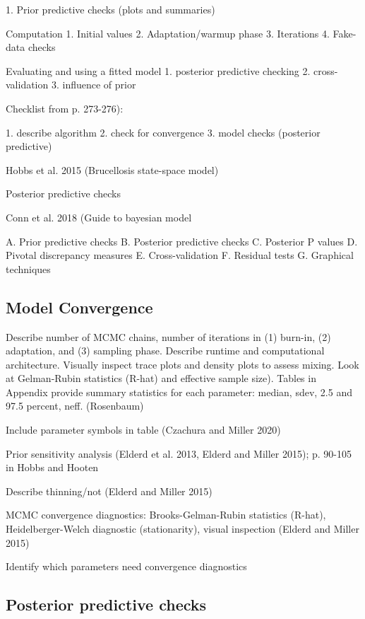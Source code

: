 \documentclass[12pt, oneside, titlepage]{article}   	%
\begin{document}
1. Prior predictive checks (plots and summaries)

Computation
1. Initial values
2. Adaptation/warmup phase
3. Iterations
4. Fake-data checks

Evaluating and using a fitted model
1. posterior predictive checking
2. cross-validation
3. influence of prior

Checklist from \cite{hobbs2015b} p. 273-276):

1. describe algorithm
2. check for convergence
3. model checks (posterior predictive)

Hobbs et al. 2015 (Brucellosis state-space model)

Posterior predictive checks

Conn et al. 2018 (Guide to bayesian model 

A. Prior predictive checks
B. Posterior predictive checks
C. Posterior P values
D. Pivotal discrepancy measures
E. Cross-validation
F. Residual tests
G. Graphical techniques

\subsection{Model Convergence}

Describe number of MCMC chains, number of iterations in (1) burn-in, (2) adaptation, and (3) sampling phase. Describe runtime and computational architecture. Visually inspect trace plots and density plots to assess mixing. Look at Gelman-Rubin statistics (R-hat) and effective sample size). Tables in Appendix provide summary statistics for each parameter: median, sdev, 2.5 and 97.5 percent, neff. (Rosenbaum)

Include parameter symbols in table (Czachura and Miller 2020)

Prior sensitivity analysis (Elderd et al. 2013, Elderd and Miller 2015); p. 90-105 in Hobbs and Hooten

Describe thinning/not (Elderd and Miller 2015)

MCMC convergence diagnostics: Brooks-Gelman-Rubin statistics (R-hat), Heidelberger-Welch diagnostic (stationarity), visual inspection (Elderd and Miller 2015)

Identify which parameters need convergence diagnostics

\subsection{Posterior predictive checks}
\end{document}
